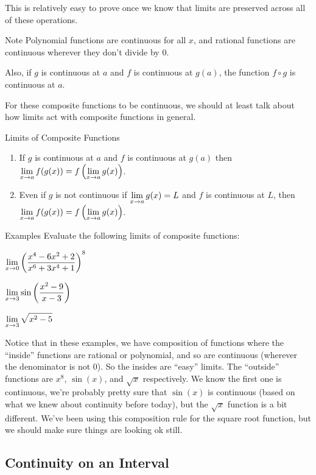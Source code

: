 This is relatively easy to prove once we know that limits are preserved across all of these operations.

\begin{note}{Note}
Polynomial functions are continuous for all $x$, and rational functions are continuous wherever they don't divide by 0.
\end{note}
Also, if $g$ is continuous at $a$ and $f$ is continuous at $g(a)$, the function $f\circ g$ is continuous at $a$.


For these composite functions to be continuous, we should at least talk about how limits act with composite functions in general.

\begin{thm}{Limits of Composite Functions}
  \hspace{1cm}
  \begin{enumerate}
    \item If $g$ is continuous at $a$ and $f$ is continuous at $g(a)$ then $\displaystyle \lim_{x\to a} f(g(x)) = f\left(\displaystyle \lim_{x\to a} g(x)\right)$.
    \item Even if $g$ is not continuous if $\displaystyle \lim_{x\to a} g(x)=L$ and $f$ is continuous at $L$, then $\displaystyle \lim_{x\to a}f(g(x))=f\left( \displaystyle \lim_{x\to a} g(x)\right)$.
  \end{enumerate}
\end{thm}

\begin{note}{Examples}
Evaluate the following limits of composite functions:
\begin{multicols}{3}
  $\displaystyle \lim_{x\to0} \left(\dfrac{x^4-6x^2+2}{x^6+3x^4+1}\right)^8$

  $\displaystyle \lim_{x\to3} \sin\left(\dfrac{x^2-9}{x-3}\right)$

  $\displaystyle \lim_{x\to3} \sqrt{x^2-5}$
\end{multicols}
Notice that in these examples, we have composition of functions where the ``inside'' functions are rational or polynomial, and so are continuous (wherever the denominator is not 0). So the insides are ``easy'' limits. The ``outside'' functions are $x^8$, $\sin(x)$, and $\sqrt{x}$ respectively. We know the first one is continuous, we're probably pretty sure that $\sin(x)$ is continuous (based on what we knew about continuity before today), but the $\sqrt{x}$ function is a bit different. We've been using this composition rule for the square root function, but we should make sure things are looking ok still.
\end{note}

\subsection*{Continuity on an Interval}

